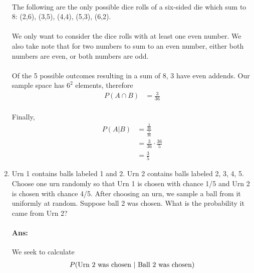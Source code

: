 \documentclass{article}
\begin{document}
\begin{enumerate}
    \paragraph{}The following are the only possible dice rolls of a six-sided die which sum to 8: (2,6), (3,5), (4,4), (5,3), (6,2).

    \paragraph{}We only want to consider the dice rolls with at least one even number. We also take note
    that for two numbers to sum to an even number, either both numbers are even, or both numbers are odd.

    \paragraph{}Of the 5 possible outcomes resulting in a sum of 8, 3 have even addends. Our
    sample space has $6^2$ elements, therefore
    \begin{align*}
        P(A \cap B) &= \frac{3}{36}
    \end{align*}

    \paragraph{}Finally,
    \begin{align*}
        P(A | B) &= \frac{\frac{3}{36}}{\frac{5}{36}}\\
                 &= \frac{3}{36} \cdot \frac{36}{5} \\
                 &= \frac{3}{5}
    \end{align*}

    \item Urn 1 contains balls labeled 1 and 2. Urn 2 contains balls labeled 2, 3, 4, 5. Choose one
    urn randomly so that Urn 1 is chosen with chance 1/5 and Urn 2 is chosen with chance
    4/5. After choosing an urn, we sample a ball from it uniformly at random. Suppose ball
    2 was chosen. What is the probability it came from Urn 2?

    \paragraph{Ans:}We seek to calculate
    \begin{align*}
        P(\text{Urn 2 was chosen \textbar{} Ball 2 was chosen})
    \end{align*}
    

\end{enumerate}
\end{document}
